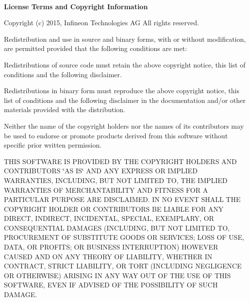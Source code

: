 ~\newline
 ~\newline
 ~\newline
 ~\newline
 

{\bfseries  License Terms and Copyright Information }

Copyright (c) 2015, Infineon Technologies AG All rights reserved.

Redistribution and use in source and binary forms, with or without modification, are permitted provided that the following conditions are met\+:
\begin{DoxyItemize}
\item Redistributions of source code must retain the above copyright notice, this list of conditions and the following disclaimer.
\item Redistributions in binary form must reproduce the above copyright notice, this list of conditions and the following disclaimer in the documentation and/or other materials provided with the distribution.
\item Neither the name of the copyright holders nor the names of its contributors may be used to endorse or promote products derived from this software without specific prior written permission.
\end{DoxyItemize}

T\+H\+IS S\+O\+F\+T\+W\+A\+RE IS P\+R\+O\+V\+I\+D\+ED BY T\+HE C\+O\+P\+Y\+R\+I\+G\+HT H\+O\+L\+D\+E\+RS A\+ND C\+O\+N\+T\+R\+I\+B\+U\+T\+O\+RS \char`\"{}\+A\+S I\+S\char`\"{} A\+ND A\+NY E\+X\+P\+R\+E\+SS OR I\+M\+P\+L\+I\+ED W\+A\+R\+R\+A\+N\+T\+I\+ES, I\+N\+C\+L\+U\+D\+I\+NG, B\+UT N\+OT L\+I\+M\+I\+T\+ED TO, T\+HE I\+M\+P\+L\+I\+ED W\+A\+R\+R\+A\+N\+T\+I\+ES OF M\+E\+R\+C\+H\+A\+N\+T\+A\+B\+I\+L\+I\+TY A\+ND F\+I\+T\+N\+E\+SS F\+OR A P\+A\+R\+T\+I\+C\+U\+L\+AR P\+U\+R\+P\+O\+SE A\+RE D\+I\+S\+C\+L\+A\+I\+M\+ED. IN NO E\+V\+E\+NT S\+H\+A\+LL T\+HE C\+O\+P\+Y\+R\+I\+G\+HT H\+O\+L\+D\+ER OR C\+O\+N\+T\+R\+I\+B\+U\+T\+O\+RS BE L\+I\+A\+B\+LE F\+OR A\+NY D\+I\+R\+E\+CT, I\+N\+D\+I\+R\+E\+CT, I\+N\+C\+I\+D\+E\+N\+T\+AL, S\+P\+E\+C\+I\+AL, E\+X\+E\+M\+P\+L\+A\+RY, OR C\+O\+N\+S\+E\+Q\+U\+E\+N\+T\+I\+AL D\+A\+M\+A\+G\+ES (I\+N\+C\+L\+U\+D\+I\+NG, B\+UT N\+OT L\+I\+M\+I\+T\+ED TO, P\+R\+O\+C\+U\+R\+E\+M\+E\+NT OF S\+U\+B\+S\+T\+I\+T\+U\+TE G\+O\+O\+DS OR S\+E\+R\+V\+I\+C\+ES; L\+O\+SS OF U\+SE, D\+A\+TA, OR P\+R\+O\+F\+I\+TS; OR B\+U\+S\+I\+N\+E\+SS I\+N\+T\+E\+R\+R\+U\+P\+T\+I\+ON) H\+O\+W\+E\+V\+ER C\+A\+U\+S\+ED A\+ND ON A\+NY T\+H\+E\+O\+RY OF L\+I\+A\+B\+I\+L\+I\+TY, W\+H\+E\+T\+H\+ER IN C\+O\+N\+T\+R\+A\+CT, S\+T\+R\+I\+CT L\+I\+A\+B\+I\+L\+I\+TY, OR T\+O\+RT (I\+N\+C\+L\+U\+D\+I\+NG N\+E\+G\+L\+I\+G\+E\+N\+CE OR O\+T\+H\+E\+R\+W\+I\+SE) A\+R\+I\+S\+I\+NG IN A\+NY W\+AY O\+UT OF T\+HE U\+SE OF T\+H\+IS S\+O\+F\+T\+W\+A\+RE, E\+V\+EN IF A\+D\+V\+I\+S\+ED OF T\+HE P\+O\+S\+S\+I\+B\+I\+L\+I\+TY OF S\+U\+CH D\+A\+M\+A\+GE.

